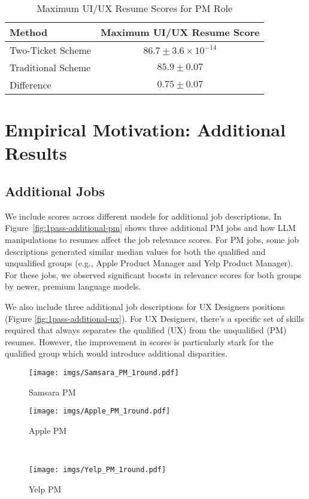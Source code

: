 \begin{table}[h!]
\centering
\begin{tabular}{|l|c|}
\hline
\textbf{Method} & \textbf{Maximum UI/UX Resume Score} \\
\hline
Two-Ticket Scheme & $86.7 \pm 3.6 \times 10^{-14}$ \\
Traditional Scheme & $85.9 \pm 0.07$ \\
Difference & $0.75 \pm 0.07$ \\
\hline
\end{tabular}
\caption{Maximum UI/UX Resume Scores for PM Role}
\label{tab: max UI/UX resume scores}
\end{table}


\section{Empirical Motivation: Additional Results}
\label{app:emp-motivation}
\subsection{Additional Jobs}
We include scores across different models for additional job descriptions. In Figure~\ref{fig:1pass-additional-pm} shows three additional PM jobs and how LLM manipulations to resumes affect the job relevance scores. For PM jobs, some job descriptions generated similar median values for both the qualified and unqualified groups (e.g., Apple Product Manager and Yelp Product Manager). For these jobs, we observed significant boosts in relevance scores for both groups by newer, premium language models.

We also include three additional job descriptions for UX Designers positions (Figure \ref{fig:1pass-additional-ux}). For UX Designers, there's a specific set of skills required that always separates the qualified (UX) from the unqualified (PM) resumes. However, the improvement in scores is particularly stark for the qualified group which would introduce additional disparities. 


\begin{figure*}
    \centering
    \begin{subfigure}{0.3\textwidth}
        \centering
        \texttt{[image: imgs/Samsara\_PM\_1round.pdf]}
        \caption{Samsara PM}
    \end{subfigure}%
    \begin{subfigure}{0.3\textwidth}
        \centering
        \texttt{[image: imgs/Apple\_PM\_1round.pdf]}
        \caption{Apple PM}
    \end{subfigure}
    ~
    \begin{subfigure}{0.3\textwidth}
        \centering
        \texttt{[image: imgs/Yelp\_PM\_1round.pdf]}
        \caption{Yelp PM}
    \end{subfigure}%

    \caption{Resume score distribution of 50 qualified (matching occupation) and 50 unqualified (different occupation) resumes before and after LLM manipulations for more Product Manager Job Descriptions}
    \label{fig:1pass-additional-pm}
\end{figure*}

